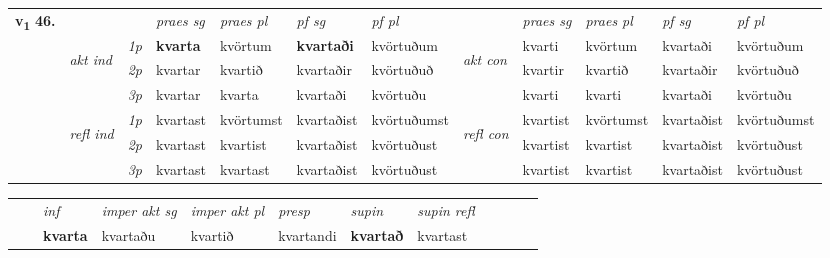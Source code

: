\begin{tabular}{llllllllllll} \toprule
\multirow{4}{*}{{{\textbf{v{\textsubscript{1}}} \Large{\textbf{46.}}}}}  & &   &  \textit{praes sg}  & \textit{praes pl}  &\textit{ pf sg} & \textit{pf pl} &  &  \textit{praes sg}  & \textit{praes pl}  & \textit{pf sg} & \textit{pf pl } \\*
	\cmidrule{4-7} \cmidrule{9-12}
 & \multirow{3}{*}{\begin{turn}{90}\textit{akt ind}\end{turn}} & {\textit{1p}} & \textbf{kvarta} & kvörtum    & \textbf{kvartaði} & kvörtuðum & \multirow{3}{*}{\begin{turn}{90}\textit{akt con}\end{turn}} &kvarti & kvörtum & kvartaði & kvörtuðum\\*
& &  {\textit{2p}} &  kvartar  & kvartið   & kvartaðir & kvörtuðuð & & kvartir & kvartið & kvartaðir & kvörtuðuð \\*
& &  {\textit{3p}} & kvartar & kvarta   & kvartaði & kvörtuðu & & kvarti & kvarti& kvartaði & kvörtuðu  \\*
\cmidrule{4-7} \cmidrule{9-12}
 &\multirow{3}{*}{\begin{turn}{90}\textit{refl ind}\end{turn}} & {\textit{1p}} & kvartast & kvörtumst    & kvartaðist & kvörtuðumst & \multirow{3}{*}{\begin{turn}{90}\textit{refl con}\end{turn}}  &kvartist & kvörtumst & kvartaðist & kvörtuðumst\\*
 &&  {\textit{2p}} &  kvartast  & kvartist   & kvartaðist & kvörtuðust & &kvartist & kvartist & kvartaðist & kvörtuðust \\*
& &  {\textit{3p}} & kvartast & kvartast   & kvartaðist & kvörtuðust & & kvartist & kvartist& kvartaðist & kvörtuðust  \\*
\cmidrule{4-7} \cmidrule{9-12}
\end{tabular}


\begin{tabular}{llllllllllll}
 & & \textit{inf} & \textit{imper akt sg} & \textit{imper akt pl}   & \textit{presp} & \textit{supin} & \textit{supin refl}      \\*
  & & \textbf{kvarta} & kvartaðu  & kvartið   & kvartandi &  \textbf{kvartað} & kvartast  \\*
\cmidrule{1-12}
\end{tabular}



